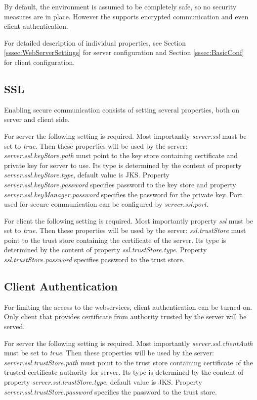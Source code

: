 
By default, the environment is assumed to be completely safe, so no security
measures are in place. However the \textan{} supports encrypted communication
and even client authentication.

For detailed description of individual properties, see Section
\ref{sssec:WebServerSettings} for server configuration and Section
\ref{sssec:BasicConf} for client configuration.

\subsection{SSL}

Enabling secure communication consists of setting several properties, both
on server and client side.

For server the following setting is required. Most importantly \emph{server.ssl} must
be set to \emph{true}. Then these properties will be used by the server:
\emph{server.ssl.keyStore.path} must point to the key store containing
certificate and private key for server to use. Its type is determined by
the content of property \emph{server.ssl.keyStore.type}, default value is JKS.
Property \emph{server.ssl.keyStore.password} specifies password to the key
store and property \emph{server.ssl.keyManager.password} specifies the password
for the private key. Port used for secure communication can be configured by
\emph{server.ssl.port}.

For client the following setting is required. Most importantly property \emph{ssl} must
be set to \emph{true}. Then these properties will be used by the server:
\emph{ssl.trustStore} must point to the trust store containing the certificate
of the server. Its type is determined by the content of property
\emph{ssl.trustStore.type}. Property \emph{ssl.trustStore.password} specifies
password to the trust store.

\subsection{Client Authentication}

For limiting the access to the webservices, client authentication can be turned
on. Only client that provides certificate from authority trusted by the server
will be served.

For server the following setting is required. Most importantly
\emph{server.ssl.clientAuth} must be set to \emph{true}. Then these properties
will be used by the server: \emph{server.ssl.trustStore.path} must point to the
trust store containing certificate of the trusted certificate authority for
server. Its type is determined by the content of property
\emph{server.ssl.trustStore.type}, default value is JKS. Property
\emph{server.ssl.trustStore.password} specifies the password to the trust
store.

